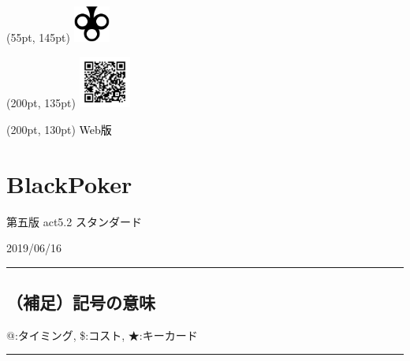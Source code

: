 \documentclass[twocolumn,a5paper,papersize,10pt]{jarticle}
\title{\empty}
\author{\empty}
\date{\empty}
\begin{document}
\begin{textblock*}{0.4\linewidth}(55pt, 145pt)
    \centering
    \includegraphics[width=1.2cm]{blackpoker_logo.pdf}
\end{textblock*}

\begin{textblock*}{0.4\linewidth}(200pt, 135pt)
    \centering
    \includegraphics[width=1.7cm,keepaspectratio]{qr_blackpoker-support_v5-std.pdf}
\end{textblock*}
\begin{textblock*}{0.4\linewidth}(200pt, 130pt)
    \centering
    \textcolor{black}{Web版}
\end{textblock*}


\section*{\textrm{\Large BlackPoker}}
\vspace{-1zh}%
\noindent

\begin{center}
{\footnotesize 第五版 act5.2 スタンダード}

{\scriptsize 2019/06/16}
\end{center}

\scriptsize%
\renewcommand{\labelitemi}{・}%
\hrule height 0.5mm depth 0mm width 66.5mm %
\vspace{-3zh}%
\subsection*{（補足）記号の意味}
\vspace{-1zh}%
{\small @:タイミング, 
\$:コスト, 
★:キーカード}

\vspace{1mm}%
\hrule height 0.1mm depth 0mm width 66.5mm %
\vspace{-3zh}%
\end{document}

